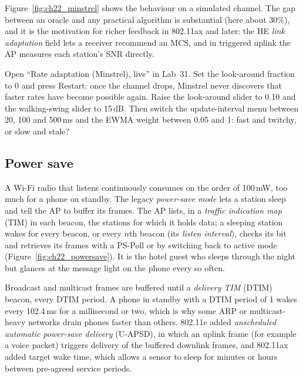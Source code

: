 
Figure~\ref{fig:ch22_minstrel} shows the behaviour on a simulated channel. The gap between an oracle
and any practical algorithm is substantial (here about 30\%), and it is the motivation for richer
feedback in 802.11ax and later: the HE \emph{link adaptation} field lets a receiver recommend an MCS,
and in triggered uplink the AP measures each station's SNR directly.

\begin{tryit}
Open ``Rate adaptation (Minstrel), live'' in Lab~31. Set the look-around fraction to 0 and press
Restart: once the channel drops, Minstrel never discovers that faster rates have become possible
again. Raise the look-around slider to 0.10 and the walking-swing slider to 15\,dB. Then switch the
update-interval menu between 20, 100 and 500\,ms and the EWMA weight between 0.05 and 1: fast and
twitchy, or slow and stale?
\end{tryit}

\subsection{Power save}

A Wi-Fi radio that listens continuously consumes on the order of 100\,mW, too much for a phone on
standby. The legacy \emph{power-save mode} lets a station sleep and tell the AP to buffer its frames.
The AP lists, in a \emph{traffic indication map} (TIM) in each beacon, the stations for which it holds
data; a sleeping station wakes for every beacon, or every $n$th beacon (its \emph{listen interval}),
checks its bit and retrieves its frames with a PS-Poll or by switching back to active mode
(Figure~\ref{fig:ch22_powersave}). It is the hotel guest who sleeps through the night but glances at
the message light on the phone every so often.

Broadcast and multicast frames are buffered until a \emph{delivery TIM} (DTIM) beacon, every DTIM
period. A phone in standby with a DTIM period of 1 wakes every 102.4\,ms for a millisecond or two,
which is why some ARP or multicast-heavy networks drain phones faster than others. 802.11e added
\emph{unscheduled automatic power-save delivery} (U-APSD), in which an uplink frame (for example a
voice packet) triggers delivery of the buffered downlink frames, and 802.11ax added target wake
time, which allows a sensor to sleep for minutes or hours between pre-agreed service periods.

